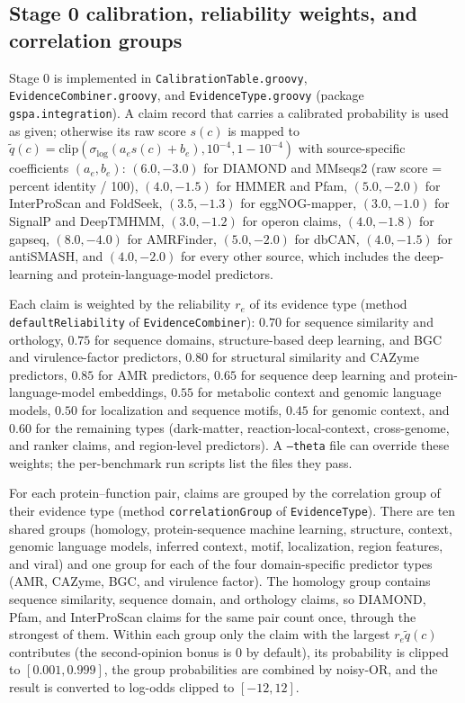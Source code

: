 \documentclass[10pt]{article}
\newcommand{\fn}[1]{\nolinkurl{#1}}
\begin{document}


\subsection{Stage 0 calibration, reliability weights, and correlation groups}

Stage 0 is implemented in \fn{CalibrationTable.groovy}, \fn{EvidenceCombiner.groovy}, and \fn{EvidenceType.groovy} (package \texttt{gspa.integration}). A claim record that carries a calibrated probability is used as given; otherwise its raw score $s(c)$ is mapped to $\tilde{q}(c) = \text{clip}(\sigma_{\text{log}}(a_e s(c) + b_e), 10^{-4}, 1 - 10^{-4})$ with source-specific coefficients $(a_e, b_e)$: $(6.0, -3.0)$ for DIAMOND and MMseqs2 (raw score = percent identity / 100), $(4.0, -1.5)$ for HMMER and Pfam, $(5.0, -2.0)$ for InterProScan and FoldSeek, $(3.5, -1.3)$ for eggNOG-mapper, $(3.0, -1.0)$ for SignalP and DeepTMHMM, $(3.0, -1.2)$ for operon claims, $(4.0, -1.8)$ for gapseq, $(8.0, -4.0)$ for AMRFinder, $(5.0, -2.0)$ for dbCAN, $(4.0, -1.5)$ for antiSMASH, and $(4.0, -2.0)$ for every other source, which includes the deep-learning and protein-language-model predictors.

Each claim is weighted by the reliability $r_e$ of its evidence type (method \texttt{defaultReliability} of \texttt{EvidenceCombiner}): $0.70$ for sequence similarity and orthology, $0.75$ for sequence domains, structure-based deep learning, and BGC and virulence-factor predictors, $0.80$ for structural similarity and CAZyme predictors, $0.85$ for AMR predictors, $0.65$ for sequence deep learning and protein-language-model embeddings, $0.55$ for metabolic context and genomic language models, $0.50$ for localization and sequence motifs, $0.45$ for genomic context, and $0.60$ for the remaining types (dark-matter, reaction-local-context, cross-genome, and ranker claims, and region-level predictors). A \texttt{--theta} file can override these weights; the per-benchmark run scripts list the files they pass.

For each protein--function pair, claims are grouped by the correlation group of their evidence type (method \texttt{correlationGroup} of \texttt{EvidenceType}). There are ten shared groups (homology, protein-sequence machine learning, structure, context, genomic language models, inferred context, motif, localization, region features, and viral) and one group for each of the four domain-specific predictor types (AMR, CAZyme, BGC, and virulence factor). The homology group contains sequence similarity, sequence domain, and orthology claims, so DIAMOND, Pfam, and InterProScan claims for the same pair count once, through the strongest of them. Within each group only the claim with the largest $r_e \tilde{q}(c)$ contributes (the second-opinion bonus is $0$ by default), its probability is clipped to $[0.001, 0.999]$, the group probabilities are combined by noisy-OR, and the result is converted to log-odds clipped to $[-12, 12]$.
\end{document}
